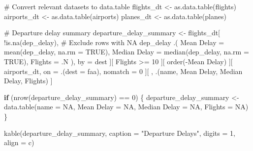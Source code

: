 \documentclass[
  12pt,
]{article}
\newenvironment{Shaded}{\begin{snugshade}}{\end{snugshade}}
\newcommand{\AttributeTok}[1]{\textcolor[rgb]{0.40,0.45,0.13}{#1}}
\newcommand{\CommentTok}[1]{\textcolor[rgb]{0.37,0.37,0.37}{#1}}
\newcommand{\ConstantTok}[1]{\textcolor[rgb]{0.56,0.35,0.01}{#1}}
\newcommand{\ControlFlowTok}[1]{\textcolor[rgb]{0.00,0.23,0.31}{\textbf{#1}}}
\newcommand{\DecValTok}[1]{\textcolor[rgb]{0.68,0.00,0.00}{#1}}
\newcommand{\FunctionTok}[1]{\textcolor[rgb]{0.28,0.35,0.67}{#1}}
\newcommand{\NormalTok}[1]{\textcolor[rgb]{0.00,0.23,0.31}{#1}}
\newcommand{\OtherTok}[1]{\textcolor[rgb]{0.00,0.23,0.31}{#1}}
\newcommand{\SpecialCharTok}[1]{\textcolor[rgb]{0.37,0.37,0.37}{#1}}
\newcommand{\StringTok}[1]{\textcolor[rgb]{0.13,0.47,0.30}{#1}}
\begin{document}
\begin{Shaded}
\begin{Highlighting}[]
\CommentTok{\# Convert relevant datasets to data.table}
\NormalTok{flights\_dt }\OtherTok{\textless{}{-}} \FunctionTok{as.data.table}\NormalTok{(flights)}
\NormalTok{airports\_dt }\OtherTok{\textless{}{-}} \FunctionTok{as.data.table}\NormalTok{(airports)}
\NormalTok{planes\_dt }\OtherTok{\textless{}{-}} \FunctionTok{as.data.table}\NormalTok{(planes)}

\CommentTok{\# Departure delay summary}
\NormalTok{departure\_delay\_summary }\OtherTok{\textless{}{-}}\NormalTok{ flights\_dt[}
  \SpecialCharTok{!}\FunctionTok{is.na}\NormalTok{(dep\_delay), }\CommentTok{\# Exclude rows with NA dep\_delay}
\NormalTok{  .(}
    \StringTok{\textasciigrave{}}\AttributeTok{Mean Delay}\StringTok{\textasciigrave{}} \OtherTok{=} \FunctionTok{mean}\NormalTok{(dep\_delay, }\AttributeTok{na.rm =} \ConstantTok{TRUE}\NormalTok{),}
    \StringTok{\textasciigrave{}}\AttributeTok{Median Delay}\StringTok{\textasciigrave{}} \OtherTok{=} \FunctionTok{median}\NormalTok{(dep\_delay, }\AttributeTok{na.rm =} \ConstantTok{TRUE}\NormalTok{),}
    \AttributeTok{Flights =}\NormalTok{ .N}
\NormalTok{  ), by }\OtherTok{=}\NormalTok{ dest}
\NormalTok{][}
\NormalTok{  Flights }\SpecialCharTok{\textgreater{}=} \DecValTok{10}
\NormalTok{][}
  \FunctionTok{order}\NormalTok{(}\SpecialCharTok{{-}}\StringTok{\textasciigrave{}}\AttributeTok{Mean Delay}\StringTok{\textasciigrave{}}\NormalTok{)}
\NormalTok{][}
\NormalTok{  airports\_dt, on }\OtherTok{=}\NormalTok{ .(}\AttributeTok{dest =}\NormalTok{ faa), nomatch }\OtherTok{=} \DecValTok{0}
\NormalTok{][}
\NormalTok{  , .(name, }\StringTok{\textasciigrave{}}\AttributeTok{Mean Delay}\StringTok{\textasciigrave{}}\NormalTok{, }\StringTok{\textasciigrave{}}\AttributeTok{Median Delay}\StringTok{\textasciigrave{}}\NormalTok{, Flights) }
\NormalTok{]}

\ControlFlowTok{if}\NormalTok{ (}\FunctionTok{nrow}\NormalTok{(departure\_delay\_summary) }\SpecialCharTok{==} \DecValTok{0}\NormalTok{) \{}
\NormalTok{  departure\_delay\_summary }\OtherTok{\textless{}{-}} \FunctionTok{data.table}\NormalTok{(}\AttributeTok{name =} \ConstantTok{NA}\NormalTok{, }\StringTok{\textasciigrave{}}\AttributeTok{Mean Delay}\StringTok{\textasciigrave{}} \OtherTok{=} \ConstantTok{NA}\NormalTok{, }
                                        \StringTok{\textasciigrave{}}\AttributeTok{Median Delay}\StringTok{\textasciigrave{}} \OtherTok{=} \ConstantTok{NA}\NormalTok{, }\AttributeTok{Flights =} \ConstantTok{NA}\NormalTok{)}
\NormalTok{\}}

\FunctionTok{kable}\NormalTok{(departure\_delay\_summary, }\AttributeTok{caption =} \StringTok{"Departure Delays"}\NormalTok{, }
      \AttributeTok{digits =} \DecValTok{1}\NormalTok{, }\AttributeTok{align =} \StringTok{\textquotesingle{}c\textquotesingle{}}\NormalTok{)}
\end{Highlighting}
\end{Shaded}
\end{document}
